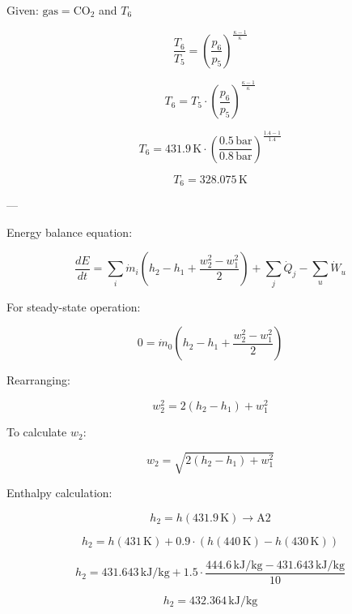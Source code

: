 Given: \( \text{gas} = \text{CO}_2 \) and \( T_6 \)  

\[
\frac{T_6}{T_5} = \left( \frac{p_6}{p_5} \right)^{\frac{\kappa - 1}{\kappa}}
\]

\[
T_6 = T_5 \cdot \left( \frac{p_6}{p_5} \right)^{\frac{\kappa - 1}{\kappa}}
\]

\[
T_6 = 431.9 \, \text{K} \cdot \left( \frac{0.5 \, \text{bar}}{0.8 \, \text{bar}} \right)^{\frac{1.4 - 1}{1.4}}
\]

\[
T_6 = 328.075 \, \text{K}
\]

---

Energy balance equation:  

\[
\frac{dE}{dt} = \sum_i \dot{m}_i \left( h_2 - h_1 + \frac{w_2^2 - w_1^2}{2} \right) + \sum_j \dot{Q}_j - \sum_u \dot{W}_u
\]

For steady-state operation:  

\[
0 = \dot{m}_0 \left( h_2 - h_1 + \frac{w_2^2 - w_1^2}{2} \right)
\]

Rearranging:  

\[
w_2^2 = 2 \left( h_2 - h_1 \right) + w_1^2
\]

To calculate \( w_2 \):  

\[
w_2 = \sqrt{2 \left( h_2 - h_1 \right) + w_1^2}
\]

Enthalpy calculation:  

\[
h_2 = h \left( 431.9 \, \text{K} \right) \rightarrow \text{A2}
\]

\[
h_2 = h \left( 431 \, \text{K} \right) + 0.9 \cdot \left( h \left( 440 \, \text{K} \right) - h \left( 430 \, \text{K} \right) \right)
\]

\[
h_2 = 431.643 \, \text{kJ/kg} + 1.5 \cdot \frac{444.6 \, \text{kJ/kg} - 431.643 \, \text{kJ/kg}}{10}
\]

\[
h_2 = 432.364 \, \text{kJ/kg}
\]